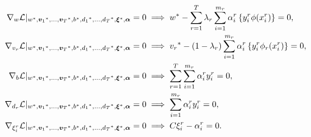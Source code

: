 \begin{align}
    \grad_{{w}} \lagr \vert_{\optim{{w}}, \optim{\fv{v}_1}, \ldots, \optim{\fv{v}_\ntasks}, \optim{b}, \optim{d_1}, \ldots, \optim{d_\ntasks}, \optim{\fv{\xi}}, {\fv{\alpha}}} = 0  &\implies \optim{{w}} - \sum_{r= 1}^\ntasks \lambda_r \sum_{i=1}^{m_r} {\alpha_i^r} \left\lbrace y_i^r \phi(x_i^r) \right\rbrace = 0 , \label{eq:common_repr_conv_l2} \\
    \grad_{{v}_r} \lagr \vert_{\optim{{w}}, \optim{\fv{v}_1}, \ldots, \optim{\fv{v}_\ntasks}, \optim{b}, \optim{d_1}, \ldots, \optim{d_\ntasks}, \optim{\fv{\xi}}, {\fv{\alpha}}} = 0 &\implies \optim{{v}_r} - (1 - \lambda_r) \sum_{i=1}^{m_r} {\alpha_i^r} \left\lbrace y_i^r \phi_r(x_i^r) \right\rbrace = 0 , \label{eq:specific_repr_conv_l2} \\
    \grad_{b} \lagr \vert_{\optim{{w}}, \optim{\fv{v}_1}, \ldots, \optim{\fv{v}_\ntasks}, \optim{b}, \optim{d_1}, \ldots, \optim{d_\ntasks}, \optim{\fv{\xi}}, {\fv{\alpha}}} = 0  &\implies \sum_{r= 1}^T \sum_{i=1}^{m_r} {\alpha_i^r} y_i^r = 0 , \label{eq:specific_eqconstr_conv_l2}  \\
    \grad_{{d}_r} \lagr \vert_{\optim{{w}}, \optim{\fv{v}_1}, \ldots, \optim{\fv{v}_\ntasks}, \optim{b}, \optim{d_1}, \ldots, \optim{d_\ntasks}, \optim{\fv{\xi}}, {\fv{\alpha}}} = 0 &\implies \sum_{i=1}^{m_r} {\alpha_i^r} y_i^r = 0 , \label{eq:common_eqconstr_conv_l2} \\
    \grad_{\xi_i^r} \lagr \vert_{\optim{{w}}, \optim{\fv{v}_1}, \ldots, \optim{\fv{v}_\ntasks}, \optim{b}, \optim{d_1}, \ldots, \optim{d_\ntasks}, \optim{\fv{\xi}}, {\fv{\alpha}}} = 0 &\implies C \xi_i^r - {\alpha_i^r} = 0 . \label{eq:xi_feas_conv_l2}
\end{align}
